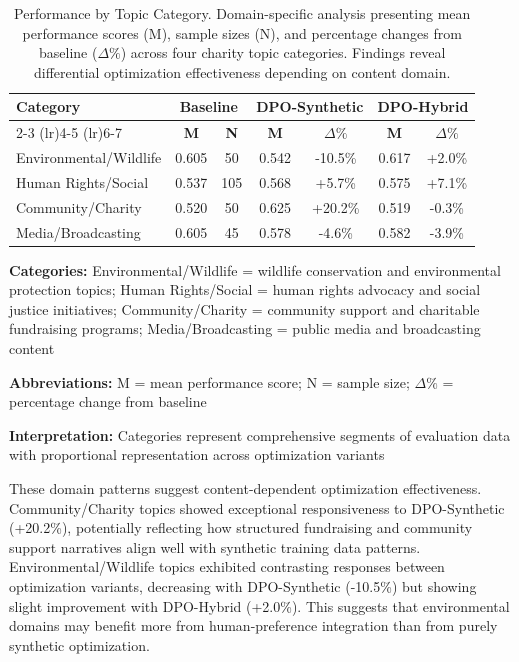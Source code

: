 \begin{table}[H]
\centering
\begin{tabular}{lcccccc}
\toprule
\multirow{2}{*}{\textbf{Category}} & \multicolumn{2}{c}{\textbf{Baseline}} & \multicolumn{2}{c}{\textbf{DPO-Synthetic}} & \multicolumn{2}{c}{\textbf{DPO-Hybrid}} \\
\cmidrule(lr){2-3} \cmidrule(lr){4-5} \cmidrule(lr){6-7}
& \textbf{M} & \textbf{N} & \textbf{M} & \textbf{$\Delta\%$} & \textbf{M} & \textbf{$\Delta\%$} \\
\midrule
Environmental/Wildlife & 0.605 & 50 & 0.542 & -10.5\% & 0.617 & +2.0\% \\
Human Rights/Social & 0.537 & 105 & 0.568 & +5.7\% & 0.575 & +7.1\% \\
Community/Charity & 0.520 & 50 & 0.625 & +20.2\% & 0.519 & -0.3\% \\
Media/Broadcasting & 0.605 & 45 & 0.578 & -4.6\% & 0.582 & -3.9\% \\

\bottomrule
\end{tabular}
\caption[Performance by Topic Category]{Performance by Topic Category. Domain-specific analysis presenting mean performance scores (M), sample sizes (N), and percentage changes from baseline ($\Delta\%$) across four charity topic categories. Findings reveal differential optimization effectiveness depending on content domain.}
\label{tab:category-analysis}
\begin{tablenotes}
\small
\item \textbf{Categories:} Environmental/Wildlife = wildlife conservation and environmental protection topics; Human Rights/Social = human rights advocacy and social justice initiatives; Community/Charity = community support and charitable fundraising programs; Media/Broadcasting = public media and broadcasting content
\item \textbf{Abbreviations:} M = mean performance score; N = sample size; $\Delta\%$ = percentage change from baseline
\item \textbf{Interpretation:} Categories represent comprehensive segments of evaluation data with proportional representation across optimization variants
\end{tablenotes}
\end{table}

These domain patterns suggest content-dependent optimization effectiveness. Community/Charity topics showed exceptional responsiveness to DPO-Synthetic (+20.2\%), potentially reflecting how structured fundraising and community support narratives align well with synthetic training data patterns. Environmental/Wildlife topics exhibited contrasting responses between optimization variants, decreasing with DPO-Synthetic (-10.5\%) but showing slight improvement with DPO-Hybrid (+2.0\%). This suggests that environmental domains may benefit more from human-preference integration than from purely synthetic optimization.

